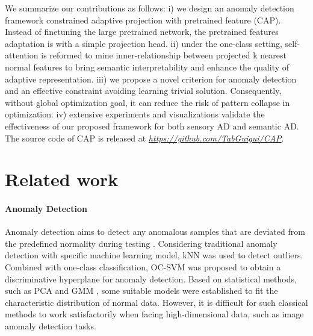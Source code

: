 \documentclass{article}
\begin{document}
We summarize our contributions as follows: i) we design an anomaly detection framework constrained adaptive projection with pretrained feature (CAP). Instead of finetuning the large pretrained network, the pretrained features adaptation is with a simple projection head. ii) under the one-class setting, self-attention is reformed to mine inner-relationship between projected k nearest normal features to bring semantic interpretability and enhance the quality of adaptive representation. iii) we propose a novel criterion for anomaly detection and an effective constraint avoiding learning trivial solution. Consequently, without global optimization goal, it can reduce the risk of pattern collapse in optimization.  iv) extensive experiments and visualizations validate the effectiveness of our proposed framework for both sensory AD and semantic AD. The source code of CAP is released at \textit{\textcolor{red}{\url{https://github.com/TabGuigui/CAP}}}.





\section{Related work}
\paragraph{Anomaly Detection} 

Anomaly detection aims to detect any anomalous samples that are deviated from the predefined normality during testing \cite{review2}. Considering traditional anomaly detection with specific machine learning model, kNN \cite{angiulli2002fast} was used to detect outliers. Combined with one-class classification, OC-SVM \cite{scholkopf2001estimating} was proposed to obtain a discriminative hyperplane for anomaly detection. Based on statistical methods, such as PCA \cite{ding2013compressed} and GMM \cite{5}, some suitable models were established to fit the characteristic distribution of normal data. However, it is difficult for such classical methods to work satisfactorily when facing high-dimensional data, such as image anomaly detection tasks.
\end{document}
